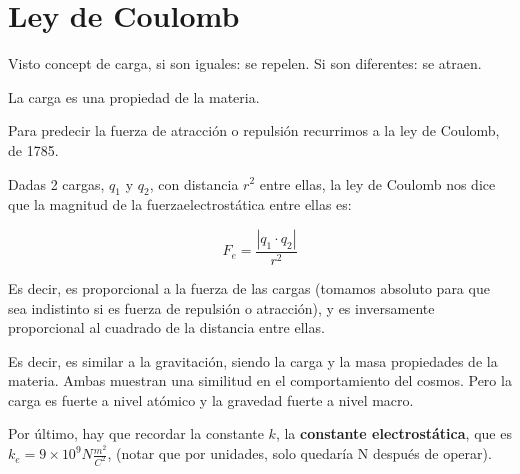 \section{Ley de Coulomb}

Visto concept de carga,
si son iguales: se repelen. 
Si son diferentes: se atraen.

La carga es una propiedad de la materia.

Para predecir la fuerza de atracción o repulsión recurrimos a la ley de Coulomb,
de 1785.

Dadas 2 cargas,
\(q_1\) y \(q_2\),
con distancia \(r^{2}\) entre ellas,
la ley de Coulomb nos dice que la magnitud de la fuerzaelectrostática entre ellas es:

\vspace{.3cm}
\begin{equation}
    F_e = \frac{|q_1\cdot q_2|}{r^{2}}
\end{equation}
\vspace{.3cm}

Es decir,
es proporcional a la fuerza de las cargas
(tomamos absoluto para que sea indistinto si es fuerza de repulsión o atracción),
y es inversamente proporcional al cuadrado de la distancia entre ellas.

Es decir,
es similar a la gravitación,
siendo la carga y la masa propiedades de la materia.
Ambas muestran una similitud en el comportamiento del cosmos.
Pero la carga es fuerte a nivel atómico y la gravedad fuerte a nivel macro.

Por último,
hay que recordar la constante \(k\),
la \textbf{constante electrostática},
que es \(k_e = 9 \times 10^{9} N \frac{m^{2}}{C^{2}}\),
(notar que por unidades, solo quedaría N después de operar).

